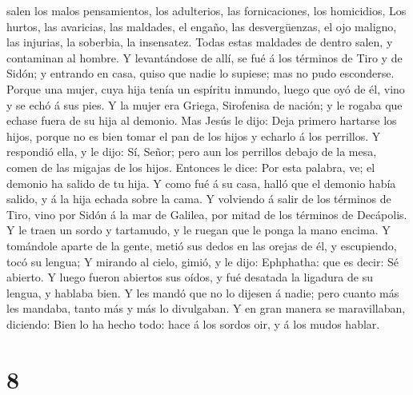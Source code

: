 salen los malos pensamientos, los adulterios, las fornicaciones, los
homicidios,  Los hurtos, las avaricias, las maldades, el
engaño, las desvergüenzas, el ojo maligno, las injurias, la soberbia, la
insensatez.  Todas estas maldades de dentro salen, y
contaminan al hombre.  Y levantándose de allí, se fué á los
términos de Tiro y de Sidón; y entrando en casa, quiso que nadie lo
supiese; mas no pudo esconderse.  Porque una mujer, cuya
hija tenía un espíritu inmundo, luego que oyó de él, vino y se echó á
sus pies.  Y la mujer era Griega, Sirofenisa de nación; y
le rogaba que echase fuera de su hija al demonio.  Mas
Jesús le dijo: Deja primero hartarse los hijos, porque no es bien tomar
el pan de los hijos y echarlo á los perrillos.  Y respondió
ella, y le dijo: Sí, Señor; pero aun los perrillos debajo de la mesa,
comen de las migajas de los hijos.  Entonces le dice: Por
esta palabra, ve; el demonio ha salido de tu hija.  Y como
fué á su casa, halló que el demonio había salido, y á la hija echada
sobre la cama.  Y volviendo á salir de los términos de
Tiro, vino por Sidón á la mar de Galilea, por mitad de los términos de
Decápolis.  Y le traen un sordo y tartamudo, y le ruegan
que le ponga la mano encima.  Y tomándole aparte de la
gente, metió sus dedos en las orejas de él, y escupiendo, tocó su
lengua;  Y mirando al cielo, gimió, y le dijo: Ephphatha:
que es decir: Sé abierto.  Y luego fueron abiertos sus
oídos, y fué desatada la ligadura de su lengua, y hablaba bien.
 Y les mandó que no lo dijesen á nadie; pero cuanto más les
mandaba, tanto más y más lo divulgaban.  Y en gran manera
se maravillaban, diciendo: Bien lo ha hecho todo: hace á los sordos oir,
y á los mudos hablar.

\hypertarget{section-7}{%
\section{8}\label{section-7}}

